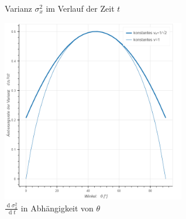 \documentclass[a4paper,12pt,ngerman]{scrartcl}
\theoremstyle{plain}
\theoremstyle{plain}
\theoremstyle{plain}
\theoremstyle{plain}
\begin{document}
\begin{figure}[H]%
    \centering
    \qquad
    \caption{Varianz $\sigma_x^2$ im Verlauf der Zeit $t$}%
    \label{fig_variance_time}%
\end{figure}
\vspace{1cm}
\begin{figure}[H]
\centering
\includegraphics[width=8cm]{varianz-winkel.png}
\caption{$\frac{\operatorname{d}\sigma_x^2}{\operatorname{d}t}$ in Abhängigkeit von $\theta$}
\label{fig_variance_angle}
\end{figure}
\end{document}
